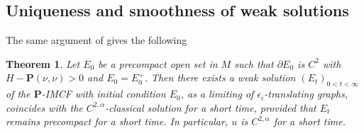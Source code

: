 \documentclass[11pt,letterpaper]{amsart}
\newtheorem{thm}{Theorem}[section]
\newtheorem{lem}[thm]{Lemma}
\theoremstyle{definition}
\theoremstyle{remark}
\newcommand{\Pten}{\mathbf P}
\begin{document}

\subsection{Uniqueness and smoothness of weak solutions}
The same argument of \cite[Theorem 5.6]{Dong26SigmaIMCF} gives the following
\begin{thm}\label{thm-smooth-uniqueness}
	Let $E_0$ be a precompact open set in $M$ such that $\partial E_0$ is $C^2$ with $H- \Pten(\nu ,\nu )>0$ and $E_0 = E_0 ^{+}$. Then there exists a weak solution $(E_t)_{0<t<\infty}$ of the $\Pten$-IMCF with initial condition $E_0$, as a limiting of $\epsilon _i$-translating graphs, coincides with the $C^{2,\alpha }$-classical solution for a short time, provided that $E_t$ remains precompact for a short time. In particular, $u$ is $C^{2,\alpha }$ for a short time.
\end{thm}
\end{document}

